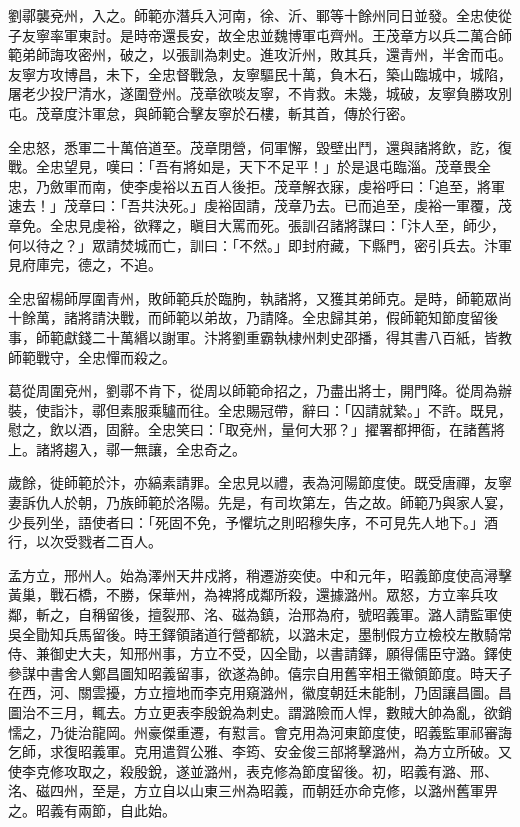 \begin{pinyinscope}
 劉鄩襲兗州，入之。師範亦潛兵入河南，徐、沂、鄆等十餘州同日並發。全忠使從子友寧率軍東討。是時帝還長安，故全忠並魏博軍屯齊州。王茂章方以兵二萬合師範弟師誨攻密州，破之，以張訓為刺史。進攻沂州，敗其兵，還青州，半舍而屯。友寧方攻博昌，未下，全忠督戰急，友寧驅民十萬，負木石，築山臨城中，城陷，屠老少投尸清水，遂圍登州。茂章欲啖友寧，不肯救。未幾，城破，友寧負勝攻別屯。茂章度汴軍怠，與師範合擊友寧於石樓，斬其首，傳於行密。



 全忠怒，悉軍二十萬倍道至。茂章閉營，伺軍懈，毀壁出鬥，還與諸將飲，訖，復戰。全忠望見，嘆曰：「吾有將如是，天下不足平！」於是退屯臨淄。茂章畏全忠，乃斂軍而南，使李虔裕以五百人後拒。茂章解衣寐，虔裕呼曰：「追至，將軍速去！」茂章曰：「吾共決死。」虔裕固請，茂章乃去。已而追至，虔裕一軍覆，茂章免。全忠見虔裕，欲釋之，瞋目大罵而死。張訓召諸將謀曰：「汴人至，師少，何以待之？」眾請焚城而亡，訓曰：「不然。」即封府藏，下縣門，密引兵去。汴軍見府庫完，德之，不追。



 全忠留楊師厚圍青州，敗師範兵於臨朐，執諸將，又獲其弟師克。是時，師範眾尚十餘萬，諸將請決戰，而師範以弟故，乃請降。全忠歸其弟，假師範知節度留後事，師範獻錢二十萬緡以謝軍。汴將劉重霸執棣州刺史邵播，得其書八百紙，皆教師範戰守，全忠憚而殺之。



 葛從周圍兗州，劉鄩不肯下，從周以師範命招之，乃盡出將士，開門降。從周為辦裝，使詣汴，鄩但素服乘驢而往。全忠賜冠帶，辭曰：「囚請就縶。」不許。既見，慰之，飲以酒，固辭。全忠笑曰：「取兗州，量何大邪？」擢署都押衙，在諸舊將上。諸將趨入，鄩一無讓，全忠奇之。



 歲餘，徙師範於汴，亦縞素請罪。全忠見以禮，表為河陽節度使。既受唐禪，友寧妻訴仇人於朝，乃族師範於洛陽。先是，有司坎第左，告之故。師範乃與家人宴，少長列坐，語使者曰：「死固不免，予懼坑之則昭穆失序，不可見先人地下。」酒行，以次受戮者二百人。



 孟方立，邢州人。始為澤州天井戍將，稍遷游奕使。中和元年，昭義節度使高潯擊黃巢，戰石橋，不勝，保華州，為裨將成鄰所殺，還據潞州。眾怒，方立率兵攻鄰，斬之，自稱留後，擅裂邢、洺、磁為鎮，治邢為府，號昭義軍。潞人請監軍使吳全勖知兵馬留後。時王鐸領諸道行營都統，以潞未定，墨制假方立檢校左散騎常侍、兼御史大夫，知邢州事，方立不受，囚全勖，以書請鐸，願得儒臣守潞。鐸使參謀中書舍人鄭昌圖知昭義留事，欲遂為帥。僖宗自用舊宰相王徽領節度。時天子在西，河、關雲擾，方立擅地而李克用窺潞州，徽度朝廷未能制，乃固讓昌圖。昌圖治不三月，輒去。方立更表李殷銳為刺史。謂潞險而人悍，數賊大帥為亂，欲銷懦之，乃徙治龍岡。州豪傑重遷，有懟言。會克用為河東節度使，昭義監軍祁審誨乞師，求復昭義軍。克用遣賀公雅、李筠、安金俊三部將擊潞州，為方立所破。又使李克修攻取之，殺殷銳，遂並潞州，表克修為節度留後。初，昭義有潞、邢、洺、磁四州，至是，方立自以山東三州為昭義，而朝廷亦命克修，以潞州舊軍畀之。昭義有兩節，自此始。




\end{pinyinscope}
